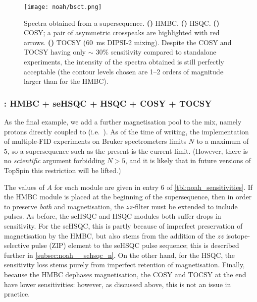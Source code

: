 \begin{figure}[!ht]
    \centering
    \texttt{[image: noah/bsct.png]}%
    {\label{fig:bsct_b}}%
    {\label{fig:bsct_s}}%
    {\label{fig:bsct_c}}%
    {\label{fig:bsct_t}}%
    \caption[Spectra obtained from a  supersequence.]{
        Spectra obtained from a  supersequence. 
        \textbf{()} HMBC.
        \textbf{()} HSQC.
        \textbf{()} COSY; a pair of asymmetric crosspeaks are highlighted with red arrows.
        \textbf{()} TOCSY (\qty{60}{\ms} DIPSI-2 mixing).
        Despite the COSY and TOCSY having only $\sim$ 30\% sensitivity compared to standalone experiments, the intensity of the spectra obtained is still perfectly acceptable (the contour levels chosen are 1--2 orders of magnitude larger than for the HMBC).
    }
    \label{fig:bsct}
\end{figure}


\subsubsection{: HMBC + \nitrogen{} seHSQC + HSQC + COSY + TOCSY}

As the final example, we add a further magnetisation pool to the mix, namely protons directly coupled to \nitrogen{} (i.e.\ ).
As of the time of writing, the implementation of multiple-FID experiments on Bruker spectrometers limits $N$ to a maximum of 5, so a supersequence such as the present  is the current limit.
(However, there is no \textit{scientific} argument forbidding $N > 5$, and it is likely that in future versions of TopSpin this restriction will be lifted.)

The values of $A$ for each module are given in entry 6 of \cref{tbl:noah_sensitivities}.
If the HMBC module is placed at the beginning of the supersequence, then in order to preserve \textit{both}  and  magnetisation, the $zz$-filter must be extended to include \nitrogen{} pulses\autocite{Kupce2019JMR}.
As before, the \nitrogen{} seHSQC and \carbon{} HSQC modules both suffer drops in sensitivity.
For the \nitrogen{} seHSQC, this is partly because of imperfect preservation of  magnetisation by the HMBC, but also stems from the addition of the $zz$ isotope-selective pulse (ZIP) element to the seHSQC pulse sequence; this is described further in \cref{subsec:noah__sehsqc_n}.
On the other hand, for the \carbon{} HSQC, the sensitivity loss stems purely from imperfect retention of  magnetisation.
Finally, because the HMBC dephases  magnetisation, the COSY and TOCSY at the end have lower sensitivities: however, as discussed above, this is not an issue in practice.

